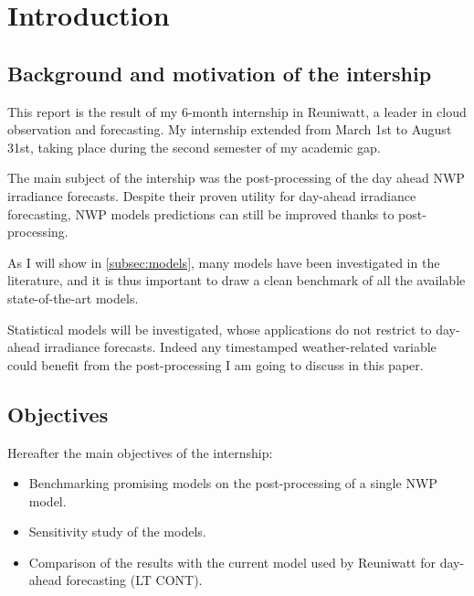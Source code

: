 \section{Introduction}
\subsection{Background and motivation of the intership}
This report is the result of my 6-month internship in Reuniwatt, a leader in cloud observation and forecasting.
My internship extended from March 1st to August 31st, taking place during the second semester of my academic gap.

The main subject of the intership was the post-processing of the day ahead NWP irradiance forecasts.
Despite their proven utility for day-ahead irradiance forecasting, NWP models predictions can still be improved thanks to post-processing.

As I will show in \ref{subsec:models}, many models have been investigated in the literature, and it is thus important to draw a clean benchmark
of all the available state-of-the-art models.

Statistical models will be investigated, whose applications do not restrict to day-ahead irradiance forecasts. Indeed any timestamped weather-related variable could benefit
from the post-processing I am going to discuss in this paper.
\subsection{Objectives}
Hereafter the main objectives of the internship:
\begin{itemize}
    \item Benchmarking promising models on the post-processing of a single NWP model.
    \item Sensitivity study of the models.
    \item Comparison of the results with the current model used by Reuniwatt for day-ahead forecasting (LT CONT).
\end{itemize}